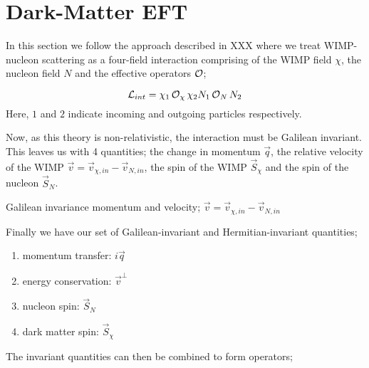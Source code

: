 \section{Dark-Matter EFT}
\par
In this section we follow the approach described in XXX where we treat WIMP-nucleon scattering as a four-field interaction comprising of the WIMP field $\chi$, the nucleon field $N$ and the effective operators $\operatorname{\mathcal{O}}$;

\begin{equation}
    \operatorname{\mathcal{L}}_{int} = \chi_{1} \operatorname{\mathcal{O}}_{\chi} \chi_{2} N_{1} \operatorname{\mathcal{O}}_{N} N_{2}
\end{equation}
Here, $1$ and $2$ indicate incoming and outgoing particles respectively.

\par
Now, as this theory is non-relativistic, the interaction must be Galilean invariant.
This leaves us with 4 quantities; the change in momentum $\vec{q}$, the relative velocity of the WIMP $\vec{v}=\vec{v}_{\chi,in} - \vec{v}_{N,in}$, the spin of the WIMP $\vec{S}_{\chi}$ and the spin of the nucleon $\vec{S}_{N}$.




\par
Galilean invariance momentum and velocity;
$\Vec{v} = \Vec{v}_{\chi,in} - \Vec{v}_{N,in}$

\par
Finally we have our set of Galilean-invariant and Hermitian-invariant quantities;
\begin{enumerate}
    \item momentum transfer: $i\Vec{q}$
    \item energy conservation: $\Vec{v}^{\bot}$
    \item nucleon spin: $\Vec{S}_{N}$
    \item dark matter spin: $\Vec{S}_{\chi}$
\end{enumerate}

\par
The invariant quantities can then be combined to form operators;

